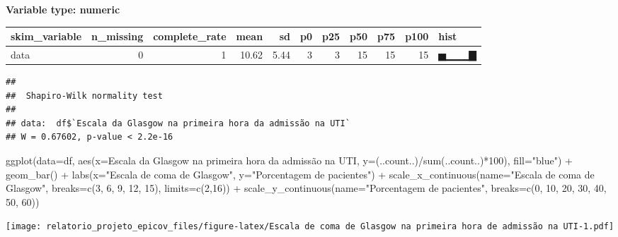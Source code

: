 \documentclass[
]{article}
\newenvironment{Shaded}{\begin{snugshade}}{\end{snugshade}}
\newcommand{\AttributeTok}[1]{\textcolor[rgb]{0.77,0.63,0.00}{#1}}
\newcommand{\DecValTok}[1]{\textcolor[rgb]{0.00,0.00,0.81}{#1}}
\newcommand{\FunctionTok}[1]{\textcolor[rgb]{0.00,0.00,0.00}{#1}}
\newcommand{\NormalTok}[1]{#1}
\newcommand{\SpecialCharTok}[1]{\textcolor[rgb]{0.00,0.00,0.00}{#1}}
\newcommand{\StringTok}[1]{\textcolor[rgb]{0.31,0.60,0.02}{#1}}
\begin{document}
\textbf{Variable type: numeric}

\begin{longtable}[]{@{}lrrrrrrrrrl@{}}
\toprule
skim\_variable & n\_missing & complete\_rate & mean & sd & p0 & p25 &
p50 & p75 & p100 & hist \\
\midrule
\endhead
data & 0 & 1 & 10.62 & 5.44 & 3 & 3 & 15 & 15 & 15 & ▅▁▁▁▇ \\
\bottomrule
\end{longtable}

\begin{Shaded}
\end{Shaded}

\begin{verbatim}
## 
##  Shapiro-Wilk normality test
## 
## data:  df$`Escala da Glasgow na primeira hora da admissão na UTI`
## W = 0.67602, p-value < 2.2e-16
\end{verbatim}

\begin{Shaded}
\begin{Highlighting}[]
\FunctionTok{ggplot}\NormalTok{(}\AttributeTok{data=}\NormalTok{df, }\FunctionTok{aes}\NormalTok{(}\AttributeTok{x=}\StringTok{\textasciigrave{}}\AttributeTok{Escala da Glasgow na primeira hora da admissão na UTI}\StringTok{\textasciigrave{}}\NormalTok{, }\AttributeTok{y=}\NormalTok{(..count..)}\SpecialCharTok{/}\FunctionTok{sum}\NormalTok{(..count..)}\SpecialCharTok{*}\DecValTok{100}\NormalTok{), }\AttributeTok{fill=}\StringTok{"blue"}\NormalTok{) }\SpecialCharTok{+}
  \FunctionTok{geom\_bar}\NormalTok{() }\SpecialCharTok{+}
  \FunctionTok{labs}\NormalTok{(}\AttributeTok{x=}\StringTok{"Escala de coma de Glasgow"}\NormalTok{, }\AttributeTok{y=}\StringTok{"Porcentagem de pacientes"}\NormalTok{) }\SpecialCharTok{+}
  \FunctionTok{scale\_x\_continuous}\NormalTok{(}\AttributeTok{name=}\StringTok{"Escala de coma de Glasgow"}\NormalTok{, }\AttributeTok{breaks=}\FunctionTok{c}\NormalTok{(}\DecValTok{3}\NormalTok{, }\DecValTok{6}\NormalTok{, }\DecValTok{9}\NormalTok{, }\DecValTok{12}\NormalTok{, }\DecValTok{15}\NormalTok{), }\AttributeTok{limits=}\FunctionTok{c}\NormalTok{(}\DecValTok{2}\NormalTok{,}\DecValTok{16}\NormalTok{)) }\SpecialCharTok{+}
  \FunctionTok{scale\_y\_continuous}\NormalTok{(}\AttributeTok{name=}\StringTok{"Porcentagem de pacientes"}\NormalTok{, }\AttributeTok{breaks=}\FunctionTok{c}\NormalTok{(}\DecValTok{0}\NormalTok{, }\DecValTok{10}\NormalTok{, }\DecValTok{20}\NormalTok{, }\DecValTok{30}\NormalTok{, }\DecValTok{40}\NormalTok{, }\DecValTok{50}\NormalTok{, }\DecValTok{60}\NormalTok{))}
\end{Highlighting}
\end{Shaded}

\texttt{[image: relatorio\_projeto\_epicov\_files/figure-latex/Escala de coma de Glasgow na primeira hora de admissão na UTI-1.pdf]}
\end{document}
